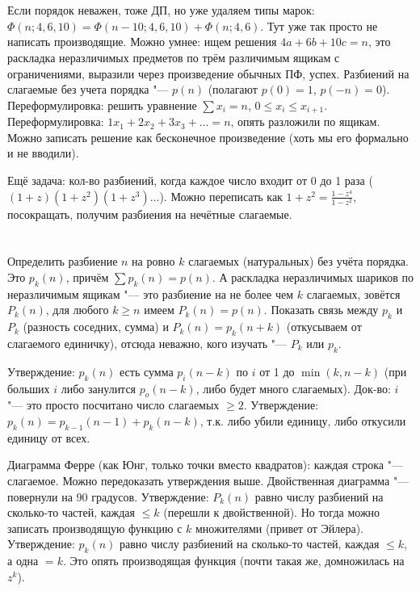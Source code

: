 \section{} %
	Если порядок неважен, тоже ДП, но уже удаляем типы марок: $\Phi(n; 4, 6, 10)=\Phi(n-10; 4, 6, 10)+\Phi(n; 4, 6)$.
	Тут уже так просто не написать производящие.
	Можно умнее: ищем решения $4a+6b+10c=n$, это раскладка неразличимых предметов по трём различимым ящикам
	с ограничениями, выразили через произведение обычных ПФ, успех.
	Разбиений на слагаемые без учета порядка "--- $p(n)$ (полагают $p(0)=1$, $p(-n)=0$).
	Переформулировка: решить уравнение $\sum x_i=n$, $0 \le x_i\le x_{i+1}$.
	Переформулировка: $1x_1+2x_2+3x_3+\dots=n$, опять разложили по ящикам.
	Можно записать решение как бесконечное произведение (хоть мы его формально и не вводили).

	Ещё задача: кол-во разбиений, когда каждое число входит от 0 до 1 раза ($(1+z)(1+z^2)(1+z^3)\dots$).
	Можно переписать как $1+z^2=\frac{1-z^4}{1-z^2}$, посокращать, получим разбиения на нечётные слагаемые.

\section{} %
	Определить разбиение $n$ на ровно $k$ слагаемых (натуральных) без учёта порядка.
	Это $p_k(n)$, причём $\sum p_k(n) = p(n)$.
	А раскладка неразличимых шариков по неразличимым ящикам "--- это разбиение на не более чем $k$ слагаемых,
	зовётся $P_k(n)$, для любого $k \ge n$ имеем $P_k(n)=p(n)$.
	Показать связь между $p_k$ и $P_k$ (разность соседних, сумма) и
	$P_k(n)=p_k(n+k)$ (откусываем от слагаемого единичку), отсюда неважно, кого изучать "--- $P_k$ или $p_k$.

	Утверждение: $p_k(n)$ есть сумма $p_i(n-k)$ по $i$ от 1 до $\min(k, n-k)$ (при больших $i$ либо
	занулится $p_o(n-k)$, либо будет много слагаемых).
	Док-во: $i$ "--- это просто посчитано число слагаемых $\ge 2$.
	Утверждение: $p_k(n)=p_{k-1}(n-1)+p_k(n-k)$, т.к. либо убили единицу,
	либо откусили единицу от всех.

	Диаграмма Ферре (как Юнг, только точки вместо квадратов): каждая строка "--- слагаемое.
	Можно передоказать утверждения выше.
	Двойственная диаграмма "--- повернули на 90 градусов.
	Утверждение: $P_k(n)$ равно числу разбиений на сколько-то частей, каждая $\le k$ (перешли к двойственной).
	Но тогда можно записать производящую функцию с $k$ множителями (привет от Эйлера).
	Утверждение: $p_k(n)$ равно числу разбиений на сколько-то частей, каждая $\le k$, а одна $=k$.
	Это опять производящая функция (почти такая же, домножилась на $z^k$).

